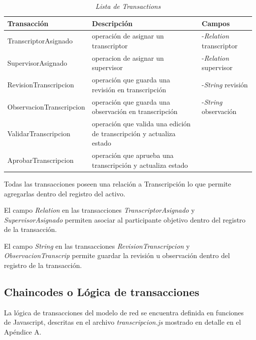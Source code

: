 \begin{table}[H]
    \centering
    \caption{\textit{Lista de Transactions}}
    \begin{tabular}{ |m{10em}|m{10em}|m{5em}| } 
        \hline
        \textbf{Transacción} & \textbf{Descripción} & \textbf {Campos} \\
            \hline
            TranscriptorAsignado &  operación de asignar un transcriptor & -\textit{Relation} transcriptor\\
            \hline
            SupervisorAsignado &  operacion de asignar un supervisor & -\textit{Relation} supervisor\\ 
            \hline
            RevisionTranscripcion &  operación que guarda una revisión en  transcripción & -\textit{String} revisión \\ 
            \hline
            ObservacionTranscripcion &  operación que guarda una observación en transcripción & -\textit{String} observación \\ 
            \hline
            ValidarTranscripcion &  operación que valida una edición  de transcripción y actualiza estado &  \\ 
            \hline
            AprobarTranscripcion & operación que aprueba una transcripción y actualiza estado &  \\ 
            \hline
    \end{tabular}
    \label{tabla:transacciones}
\end{table}

Todas las transacciones poseen una relación a Transcripción lo que permite  agregarlas dentro del registro del activo.

El campo \textit{Relation} en las transacciones \textit{TranscriptorAsignado} y \textit{SupervisorAsignado} permiten asociar al participante objetivo dentro del registro de la transacción.

El campo \textit{String} en las transacciones \textit{RevisionTranscripcion} y \textit{ObservacionTranscrip} permite guardar la revisión u observación dentro del registro de la transacción.

\subsection{Chaincodes o Lógica de transacciones}
La lógica de transacciones del modelo de red se encuentra definida   en funciones de Javascript, descritas en el archivo \textit{transcripcion.js} mostrado en detalle en el Apéndice A.

